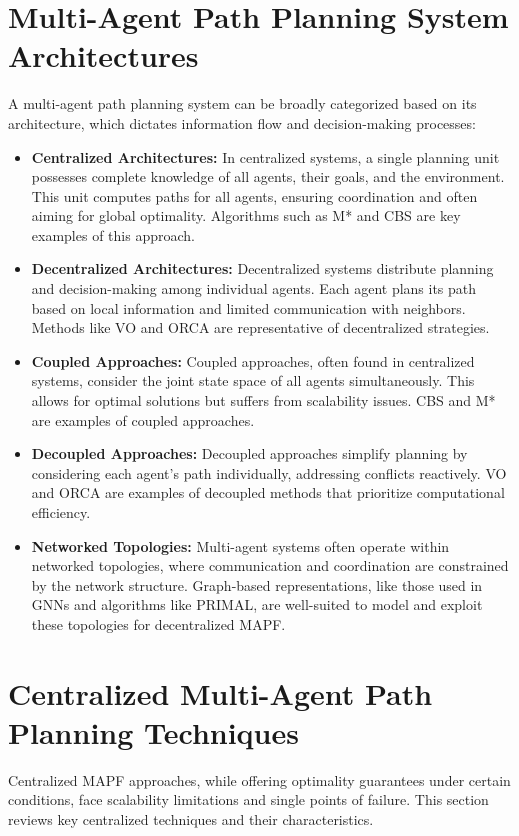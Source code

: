 \section{Multi-Agent Path Planning System Architectures}
A multi-agent path planning system can be broadly categorized based on its architecture, which dictates information flow and decision-making processes:
\begin{itemize}
    \item \textbf{Centralized Architectures:} In centralized systems, a single planning unit possesses complete knowledge of all agents, their goals, and the environment. This unit computes paths for all agents, ensuring coordination and often aiming for global optimality. Algorithms such as M* and CBS are key examples of this approach.
    \item \textbf{Decentralized Architectures:} Decentralized systems distribute planning and decision-making among individual agents. Each agent plans its path based on local information and limited communication with neighbors. Methods like VO and ORCA are representative of decentralized strategies.
    \item \textbf{Coupled Approaches:} Coupled approaches, often found in centralized systems, consider the joint state space of all agents simultaneously. This allows for optimal solutions but suffers from scalability issues. CBS and M* are examples of coupled approaches.
    \item \textbf{Decoupled Approaches:} Decoupled approaches simplify planning by considering each agent's path individually, addressing conflicts reactively. VO and ORCA are examples of decoupled methods that prioritize computational efficiency.
    \item \textbf{Networked Topologies:} Multi-agent systems often operate within networked topologies, where communication and coordination are constrained by the network structure. Graph-based representations, like those used in GNNs and algorithms like PRIMAL, are well-suited to model and exploit these topologies for decentralized MAPF.
\end{itemize}

\section{Centralized Multi-Agent Path Planning Techniques}
Centralized MAPF approaches, while offering optimality guarantees under certain conditions, face scalability limitations and single points of failure. This section reviews key centralized techniques and their characteristics.

